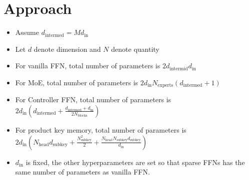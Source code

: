 \section{Approach}
\label{sec:approach}
\begin{itemize}
    \item Assume $d_\text{intermed} = Md_\text{in}$
    \item Let $d$ denote dimension and $N$ denote quantity
    \item For vanilla FFN, total number of parameters is $2d_\text{intermid}d_\text{in}$
    \item For MoE, total number of parameters is $2d_\text{in}N_\text{experts}(d_\text{intermed}+1)$
    \item For Controller FFN, total number of parameters is $2d_\text{in}(d_\text{intermed}+\frac{d_\text{intermed} + d_\text{in}}{2N_\text{blocks}})$
    \item For product key memory, total number of parameters is $2d_\text{in}(N_\text{head}d_\text{subkey}+\frac{N_\text{subkey}^2}{2}+\frac{N_\text{head}N_\text{subkey}d_\text{subkey}}{d_\text{in}})$
    \item $d_\text{in}$ is fixed, the other hyperparameters are set so that sparse FFNs has the same number of parameters as vanilla FFN.
\end{itemize}


